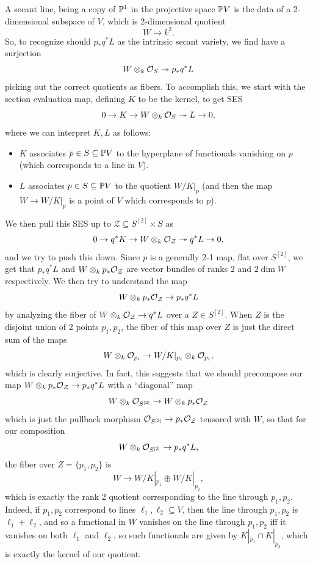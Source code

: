 \documentclass[12pt]{article}
\begin{document}
\begin{itemize}
    A secant line, being a copy of $\P^1$ in the projective space $\P V$ is the data of a 2-dimensional subspace of $V$, which is 2-dimensional quotient
    \[W \to k^2.\]
    So, to recognize should $p_*q^* L$ as the intrinsic secant variety, we find have a surjection
    \[W \otimes_k \cO_S \twoheadrightarrow p_* q^*L\]
    picking out the correct quotients as fibers. To accomplish this, we start with the section evaluation map, defining $K$ to be the kernel, to get SES
    \[0\to K \to W \otimes_k \cO_S \twoheadrightarrow L \to 0,\]
    where we can interpret $K,L$ as follows:
    \begin{itemize}
        \item $K$ associates $p\in S\subseteq \P V$ to the hyperplane of functionals vanishing on $p$ (which corresponds to a line in $V$).
        \item $L$ associates $p\in S\subseteq \P V$ to the quotient $W/K|_p$ (and then the map $W\to W/K|_p$ is a point of $V$ which corresponds to $p$).
    \end{itemize}
    We then pull this SES up to $\mathcal{Z}\subseteq S^{[2]}\times S$ as
    \[0\to q^*K \to W \otimes_k \cO_{\mathcal{Z}} \twoheadrightarrow q^*L \to 0,\]
    and we try to push this down. Since $p$ is a generally 2-1 map, flat over $S^{[2]}$, we get that $p_*q^* L$ and $W\otimes_k p_*\cO_{\mathcal{Z}}$ are vector bundles of ranks 2 and $2\dim W$ respectively. We then try to understand the map
    \[W\otimes_k p_*\cO_{\mathcal{Z}} \to p_* q^* L\]
    by analyzing the fiber of $W\otimes_k \cO_{\mathcal{Z}}\to q^*L$ over a $Z\in S^{[2]}$. When $Z$ is the disjoint union of 2 points $p_1,p_2$, the fiber of this map over $Z$ is just the direct sum of the maps
    \[W\otimes_k \cO_{p_i} \to W/K|_{p_i} \otimes_k \cO_{p_i},\]
    which is clearly surjective. In fact, this suggests that we should precompose our map $W\otimes_k p_*\cO_{\mathcal{Z}} \to p_* q^* L$ with a ``diagonal'' map
    \[W\otimes_k \cO_{S^{[2]}} \to W\otimes_k p_*\cO_{\mathcal{Z}}\]
    which is just the pullback morphism $\cO_{S^{[2]}} \to p_*\cO_{\mathcal{Z}}$ tensored with $W$, so that for our composition
    \[W\otimes_k \cO_{S^{[2]}} \to p_*q^* L,\]
    the fiber over $Z=\{p_1,p_2\}$ is 
    \[W \to W/K|_{p_1} \oplus W/K|_{p_2},\]
    which is exactly the rank 2 quotient corresponding to the line through $p_1,p_2$. Indeed, if $p_1,p_2$ correspond to lines $\ell_1,\ell_2\subseteq V$, then the line through $p_1,p_2$ is $\ell_1+\ell_2$, and so a functional in $W$ vanishes on the line through $p_1,p_2$ iff it vanishes on both $\ell_1$ and $\ell_2$, so such functionals are given by $K|_{p_1}\cap K|_{p_2}$, which is exactly the kernel of our quotient.
    

\end{itemize}
\end{document}
